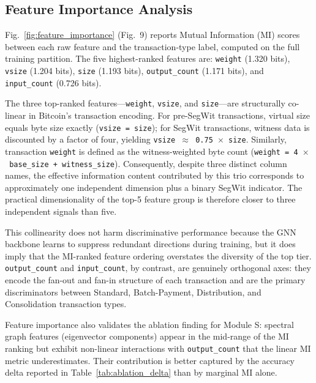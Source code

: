 
\subsection{Feature Importance Analysis}
\label{subsec:feature_importance}

Fig.~\ref{fig:feature_importance} (Fig.~9) reports Mutual Information (MI)
scores between each raw feature and the transaction-type label, computed on
the full training partition.
The five highest-ranked features are:
\texttt{weight} (1.320 bits),
\texttt{vsize} (1.204 bits),
\texttt{size} (1.193 bits),
\texttt{output\_count} (1.171 bits), and
\texttt{input\_count} (0.726 bits).

The three top-ranked features—\texttt{weight}, \texttt{vsize}, and
\texttt{size}—are structurally co-linear in Bitcoin's transaction encoding.
For pre-SegWit transactions, virtual size equals byte size exactly
(\texttt{vsize~=~size}); for SegWit transactions, witness data is discounted
by a factor of four, yielding \texttt{vsize~$\approx$~0.75~$\times$~size}.
Similarly, transaction \texttt{weight} is defined as the witness-weighted
byte count (\texttt{weight~=~4~$\times$~base\_size + witness\_size}).
Consequently, despite three distinct column names, the effective information
content contributed by this trio corresponds to approximately one
independent dimension plus a binary SegWit indicator.
The practical dimensionality of the top-5 feature group is therefore closer
to three independent signals than five.

This collinearity does not harm discriminative performance because
the GNN backbone learns to suppress redundant directions during training,
but it does imply that the MI-ranked feature ordering overstates the
diversity of the top tier.
\texttt{output\_count} and \texttt{input\_count}, by contrast, are
genuinely orthogonal axes: they encode the fan-out and fan-in structure of
each transaction and are the primary discriminators between Standard,
Batch-Payment, Distribution, and Consolidation transaction types.

Feature importance also validates the ablation finding for Module S:
spectral graph features (eigenvector components) appear in the mid-range of
the MI ranking but exhibit non-linear interactions with
\texttt{output\_count} that the linear MI metric underestimates.
Their contribution is better captured by the accuracy delta reported in
Table~\ref{tab:ablation_delta} than by marginal MI alone.

